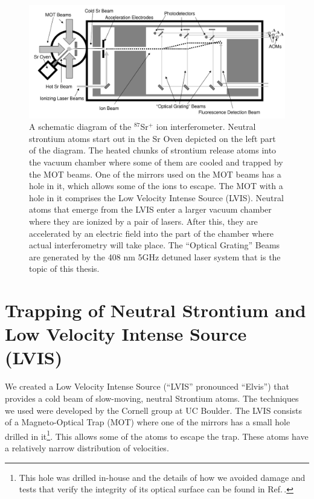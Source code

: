 \begin{figure}
\centerline{
\includegraphics[totalheight=0.3\textheight]{interferometer_diagram}
}
\caption[Ion Interferometer]{\label{fig:IonInterferometer}
A schematic diagram of the $^{87}$Sr$^+$ ion interferometer. Neutral strontium atoms start out in the Sr Oven depicted on the left part of the diagram. The heated chunks of strontium release atoms into the vacuum chamber where some of them are cooled and trapped by the MOT beams. One of the mirrors used on the MOT beams has a hole in it, which allows some of the ions to escape. The MOT with a hole in it comprises the Low Velocity Intense Source (LVIS). Neutral atoms that emerge from the LVIS enter a larger vacuum chamber where they are ionized by a pair of lasers. After this, they are accelerated by an electric field into the part of the chamber where actual interferometry will take place. The ``Optical Grating'' Beams are generated by the 408 nm 5GHz detuned laser system that is the topic of this thesis.} 
\end{figure}

\section{Trapping of Neutral Strontium and Low Velocity Intense Source (LVIS)}

We created a Low Velocity Intense Source (``LVIS'' pronounced ``Elvis'') \cite{cjeDiss} that provides a cold beam of slow-moving, neutral Strontium atoms. The techniques we used were developed by the Cornell group at UC Boulder\cite{LVIS}. The LVIS consists of a Magneto-Optical Trap (MOT) where one of the mirrors has a small hole drilled in it\footnote{This hole was drilled in-house and the details of how we avoided damage and tests that verify the integrity of its optical surface can be found in Ref.\,\cite{cjeDiss}.}. This allows some of the atoms to escape the trap. These atoms have a relatively narrow distribution of velocities. %

